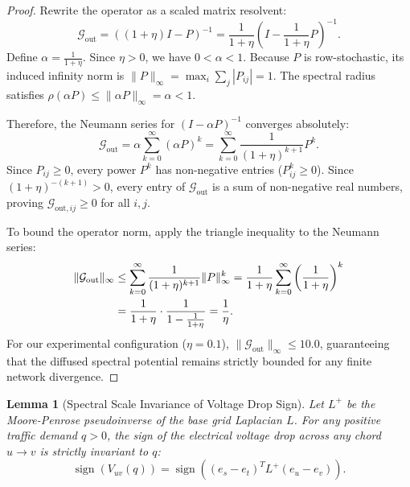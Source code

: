 \documentclass[11pt,a4paper]{article}
\newtheorem{lemma}{Lemma}
\begin{document}
\begin{proof}
Rewrite the operator as a scaled matrix resolvent:
\begin{equation}
\mathcal{G}_{\text{out}} = \left( (1 + \eta) I - P \right)^{-1} = \frac{1}{1 + \eta} \left( I - \frac{1}{1 + \eta} P \right)^{-1}.
\end{equation}
Define $\alpha = \frac{1}{1 + \eta}$. Since $\eta > 0$, we have $0 < \alpha < 1$. Because $P$ is row-stochastic, its induced infinity norm is $\|P\|_\infty = \max_i \sum_j |P_{ij}| = 1$. The spectral radius satisfies $\rho(\alpha P) \le \|\alpha P\|_\infty = \alpha < 1$.

Therefore, the Neumann series for $(I - \alpha P)^{-1}$ converges absolutely:
\begin{equation}
\mathcal{G}_{\text{out}} = \alpha \sum_{k=0}^\infty (\alpha P)^k = \sum_{k=0}^\infty \frac{1}{(1 + \eta)^{k+1}} P^k.
\end{equation}
Since $P_{ij} \ge 0$, every power $P^k$ has non-negative entries ($P^k_{ij} \ge 0$). Since $(1+\eta)^{-(k+1)} > 0$, every entry of $\mathcal{G}_{\text{out}}$ is a sum of non-negative real numbers, proving $\mathcal{G}_{\text{out}, ij} \ge 0$ for all $i, j$.

To bound the operator norm, apply the triangle inequality to the Neumann series:
\begin{align}
\|\mathcal{G}_{\text{out}}\|_\infty &\le \sum_{k=0}^\infty \frac{1}{(1 + \eta)^{k+1}} \|P\|_\infty^k = \frac{1}{1 + \eta} \sum_{k=0}^\infty \left( \frac{1}{1 + \eta} \right)^k \notag \\
&= \frac{1}{1 + \eta} \cdot \frac{1}{1 - \frac{1}{1 + \eta}} = \frac{1}{\eta}.
\end{align}
For our experimental configuration ($\eta = 0.1$), $\|\mathcal{G}_{\text{out}}\|_\infty \le 10.0$, guaranteeing that the diffused spectral potential remains strictly bounded for any finite network divergence.
\end{proof}

\begin{lemma}[Spectral Scale Invariance of Voltage Drop Sign]
\label{lem:scale_invariance}
Let $L^+$ be the Moore-Penrose pseudoinverse of the base grid Laplacian $L$. For any positive traffic demand $q > 0$, the sign of the electrical voltage drop across any chord $u \to v$ is strictly invariant to $q$:
\begin{equation}
\operatorname{sign}\left( V_{uv}(q) \right) = \operatorname{sign}\left( (e_s - e_t)^T L^+ (e_u - e_v) \right).
\end{equation}
\end{lemma}
\end{document}
